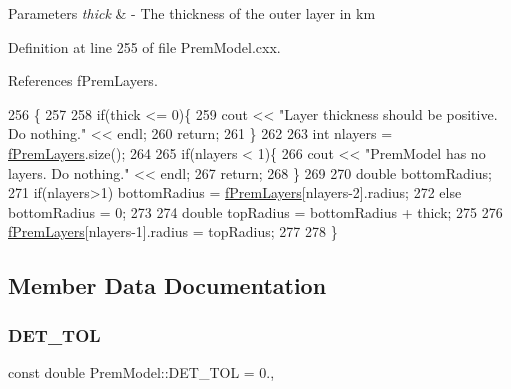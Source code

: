 \begin{DoxyParams}{Parameters}
{\em thick} & -\/ The thickness of the outer layer in km \\
\hline
\end{DoxyParams}


Definition at line 255 of file Prem\+Model.\+cxx.



References f\+Prem\+Layers.


\begin{DoxyCode}
256 \{
257 
258   \textcolor{keywordflow}{if}(thick <= 0)\{
259     cout << \textcolor{stringliteral}{"Layer thickness should be positive. Do nothing."} << endl;
260     \textcolor{keywordflow}{return};
261   \}
262 
263   \textcolor{keywordtype}{int} nlayers = \hyperlink{classOscProb_1_1PremModel_a19a9a3b23ec154ad7a29f92b74aa5bc6}{fPremLayers}.size();
264 
265   \textcolor{keywordflow}{if}(nlayers < 1)\{
266     cout << \textcolor{stringliteral}{"PremModel has no layers. Do nothing."} << endl;
267     \textcolor{keywordflow}{return};
268   \}
269 
270   \textcolor{keywordtype}{double} bottomRadius;
271   \textcolor{keywordflow}{if}(nlayers>1) bottomRadius = \hyperlink{classOscProb_1_1PremModel_a19a9a3b23ec154ad7a29f92b74aa5bc6}{fPremLayers}[nlayers-2].radius;
272   \textcolor{keywordflow}{else}          bottomRadius = 0;
273 
274   \textcolor{keywordtype}{double} topRadius = bottomRadius + thick;
275 
276   \hyperlink{classOscProb_1_1PremModel_a19a9a3b23ec154ad7a29f92b74aa5bc6}{fPremLayers}[nlayers-1].radius = topRadius;
277 
278 \}
\end{DoxyCode}


\subsection{Member Data Documentation}
\mbox{\label{classOscProb_1_1PremModel_a8ad1335ebe80ee1cd1cdf59d774ab34b}} 
\subsubsection{\texorpdfstring{D\+E\+T\+\_\+\+T\+OL}{DET\_TOL}}
{\footnotesize\ttfamily const double Prem\+Model\+::\+D\+E\+T\+\_\+\+T\+OL = 0.\hspace{0.3cm}{\ttfamily [static]}, {\ttfamily [protected]}}


